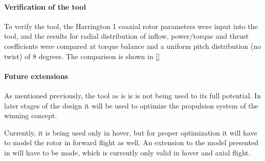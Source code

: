 \paragraph{Verification of the tool}


To verify the tool, the Harrington 1 coaxial rotor parameters were input into the tool, and the results for radial distribution of inflow, power/torque and thrust coefficients were compared at torque balance and a uniform pitch distribution (no twist) of 8 degrees. The comparison is shown in \autoref{}






\paragraph{Future extensions}

As mentioned previously, the tool as is is is not being used to its full potential. In later stages of the design it will be used to optimize the propulsion system of the winning concept.

Currently, it is being used only in hover, but for proper optimization it will have to model the rotor in forward flight as well. An extension to the model presented in \cite{BEMT} will have to be made, which is currently only valid in hover and axial flight.


